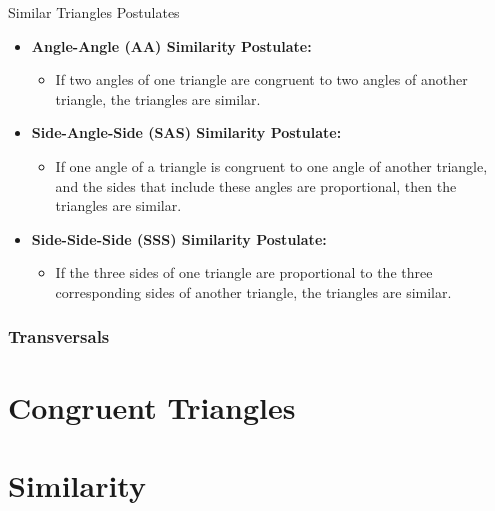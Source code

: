 \documentclass{beamer}
\begin{document}
\begin{frame}{Similar Triangles Postulates}
    \begin{itemize}
        \item \textbf{Angle-Angle (AA) Similarity Postulate:} 
        \begin{itemize}
            \item If two angles of one triangle are congruent to two angles of another triangle, the triangles are similar.
        \end{itemize}

        \item \textbf{Side-Angle-Side (SAS) Similarity Postulate:} 
        \begin{itemize}
            \item If one angle of a triangle is congruent to one angle of another triangle, and the sides that include these angles are proportional, then the triangles are similar.
        \end{itemize}

        \item \textbf{Side-Side-Side (SSS) Similarity Postulate:} 
        \begin{itemize}
            \item If the three sides of one triangle are proportional to the three corresponding sides of another triangle, the triangles are similar.
        \end{itemize}
    \end{itemize}
    
\end{frame}



\begin{frame}
    \frametitle{Transversals}
\end{frame}



\subsection{}
\section{Congruent Triangles}
\section{Similarity }
\subtitle{Algebra}
\subtitle{Probability}
\end{document}
